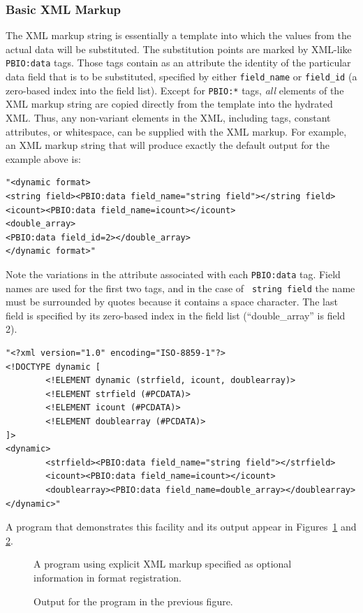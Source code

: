 \subsubsection{Basic XML Markup}
The XML markup string is essentially a template into which the values from
the actual data will be substituted.  The substitution points are marked by
XML-like {\tt PBIO:data} tags.  Those tags contain as an attribute the
identity of the particular data field that is to be substituted, specified
by either {\tt field\_name} or {\tt field\_id} (a zero-based index into the
field list).  Except for {\tt PBIO:*} tags, {\it all} elements of the XML
markup string are copied directly from the template into the hydrated XML.
Thus, any non-variant elements in the XML, including tags, constant
attributes, or whitespace, can be supplied with the XML markup.  For example,
an XML markup string that will produce exactly the default output for the
example above is:
\begin{verbatim}
"<dynamic format>
<string field><PBIO:data field_name="string field"></string field>
<icount><PBIO:data field_name=icount></icount>
<double_array>
<PBIO:data field_id=2></double_array>
</dynamic format>"
\end{verbatim}
Note the variations in the attribute associated with each {\tt PBIO:data}
tag.  Field names are used for the first two tags, and in the case of {\tt
string field} the name must be surrounded by quotes because it contains a
space character.  The last field is specified by its zero-based index in the
field list (``double\_array'' is field 2).


\begin{verbatim}
"<?xml version="1.0" encoding="ISO-8859-1"?>
<!DOCTYPE dynamic [
        <!ELEMENT dynamic (strfield, icount, doublearray)>
        <!ELEMENT strfield (#PCDATA)>
        <!ELEMENT icount (#PCDATA)>
        <!ELEMENT doublearray (#PCDATA)>
]>
<dynamic>
        <strfield><PBIO:data field_name="string field"></strfield>
        <icount><PBIO:data field_name=icount></icount>
        <doublearray><PBIO:data field_name=double_array></doublearray>
</dynamic>"
\end{verbatim}
A program that demonstrates this facility and its output appear in
Figures~\ref{xml_fig} and \ref{xml_output}.
\begin{figure}[p]
\begin{quote}
\end{quote}
\caption{A program using explicit XML markup specified as optional
information in format registration.\label{xml_fig}}
\end{figure}
\begin{figure}[t]
\begin{quote}
\end{quote}
\caption{Output for the program in the previous figure.\label{xml_output}}
\end{figure}
